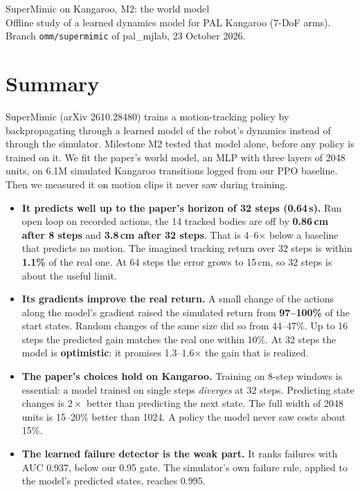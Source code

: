 \documentclass[10pt]{article}
\begin{document}
\begin{center}
{\LARGE SuperMimic on Kangaroo, M2: the world model}\\[4pt]
Offline study of a learned dynamics model for PAL Kangaroo (7-DoF arms).
Branch \texttt{omm/supermimic} of pal\_mjlab, 23 October 2026.
\end{center}

\section*{Summary}

SuperMimic (arXiv 2610.28480) trains a motion-tracking policy by backpropagating through a learned
model of the robot's dynamics instead of through the simulator. Milestone M2 tested that model alone,
before any policy is trained on it. We fit the paper's world model, an MLP with three layers of 2048 units,
on 6.1M simulated Kangaroo transitions logged from our PPO baseline. Then we measured it on motion clips
it never saw during training.

\begin{itemize}
  \item \textbf{It predicts well up to the paper's horizon of 32 steps (0.64\,s).} Run open loop on
  recorded actions, the 14 tracked bodies are off by \textbf{0.86\,cm after 8 steps} and \textbf{3.8\,cm
  after 32 steps}. That is 4--6$\times$ below a baseline that predicts no motion. The imagined tracking
  return over 32 steps is within \textbf{1.1\%} of the real one. At 64 steps the error grows to 15\,cm,
  so 32 steps is about the useful limit.
  \item \textbf{Its gradients improve the real return.} A small change of the actions along the model's
  gradient raised the simulated return from \textbf{97--100\%} of the start states. Random changes of the
  same size did so from 44--47\%. Up to 16 steps the predicted gain matches the real one within 10\%. At
  32 steps the model is \textbf{optimistic}: it promises 1.3--1.6$\times$ the gain that is realized.
  \item \textbf{The paper's choices hold on Kangaroo.} Training on 8-step windows is essential: a model
  trained on single steps \emph{diverges} at 32 steps. Predicting state changes is $2\times$ better than
  predicting the next state. The full width of 2048 units is 15--20\% better than 1024. A policy the model
  never saw costs about 15\%.
  \item \textbf{The learned failure detector is the weak part.} It ranks failures with AUC 0.937, below
  our 0.95 gate. The simulator's own failure rule, applied to the model's predicted states, reaches 0.995.
\end{itemize}
\end{document}
